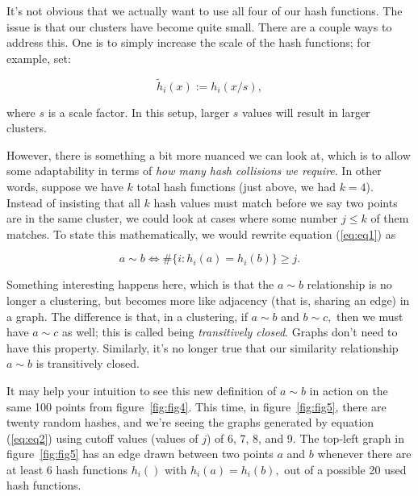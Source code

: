 \documentclass[20pt,]{extarticle}
\newcommand{\smallscrneg}{}
\begin{document}
It's not obvious that we actually want to use all four of our hash
functions. The issue is that our clusters have become quite small. There
are a couple ways to address this. One is to simply increase the scale
of the hash functions; for example, set:

\[ \tilde h_i(x) := h_i(x/s), \]

where \(s\) is a scale factor. In this setup, larger \(s\) values will
result in larger clusters.

However, there is something a bit more nuanced we can look at, which is
to allow some adaptability in terms of \emph{how many hash collisions we
require}. In other words, suppose we have \(k\) total hash functions
(just above, we had \(k=4\)). Instead of insisting that all \(k\) hash
values must match before we say two points are in the same cluster, we
could look at cases where some number \(j \le k\) of them matches. To
state this mathematically, we would rewrite equation (\ref{eq:eq1}) as

\begin{equation} a \sim b \iff \#\{i: h_i(a) = h_i(b)\} \ge j. \smallscrneg\label{eq:eq2}\end{equation}

Something interesting happens here, which is that the \(a \sim b\)
relationship is no longer a clustering, but becomes more like adjacency
(that is, sharing an edge) in a graph. The difference is that, in a
clustering, if \(a\sim b\) and \(b\sim c,\) then we must have
\(a\sim c\) as well; this is called being \emph{transitively closed}.
Graphs don't need to have this property. Similarly, it's no longer true
that our similarity relationship \(a\sim b\) is transitively closed.

It may help your intuition to see this new definition of \(a\sim b\) in
action on the same 100 points from figure~\ref{fig:fig4}. This time, in
figure~\ref{fig:fig5}, there are twenty random hashes, and we're seeing
the graphs generated by equation (\ref{eq:eq2}) using cutoff values
(values of \(j\)) of 6, 7, 8, and 9. The top-left graph in
figure~\ref{fig:fig5} has an edge drawn between two points \(a\) and
\(b\) whenever there are at least 6 hash functions \(h_i()\) with
\(h_i(a) = h_i(b),\) out of a possible 20 used hash functions.
\end{document}
